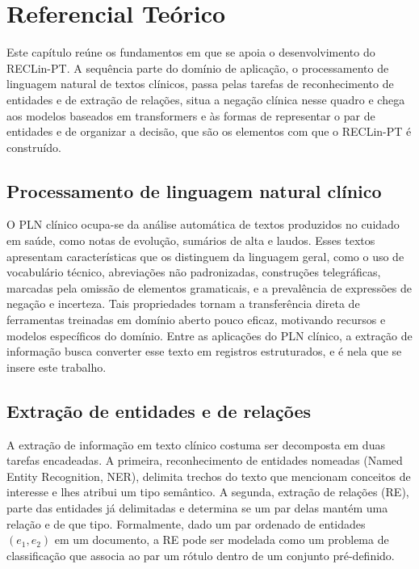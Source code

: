\chapter[Referencial Teórico]{Referencial Teórico}
\label{cap:referencial}

Este capítulo reúne os fundamentos em que se apoia o desenvolvimento do RECLin-PT. A
sequência parte do domínio de aplicação, o processamento de linguagem natural de
textos clínicos, passa pelas tarefas de reconhecimento de entidades e de extração de
relações, situa a negação clínica nesse quadro e chega aos modelos baseados em
\foreignlanguage{english}{transformers} e às formas de representar o par de entidades
e de organizar a decisão, que são os elementos com que o RECLin-PT é construído.

\section{Processamento de linguagem natural clínico}

O PLN clínico ocupa-se da análise automática de textos produzidos no cuidado em
saúde, como notas de evolução, sumários de alta e laudos. Esses textos apresentam características que os distinguem da linguagem geral, como o uso de vocabulário técnico, abreviações não padronizadas, construções telegráficas, marcadas pela omissão de elementos gramaticais, e a prevalência de expressões de negação e incerteza. Tais
propriedades tornam a transferência direta de ferramentas treinadas em domínio
aberto pouco eficaz, motivando recursos e modelos específicos do domínio. Entre as
aplicações do PLN clínico, a extração de informação busca converter esse texto em
registros estruturados, e é nela que se insere este trabalho.

\section{Extração de entidades e de relações}
\label{sec:re_tarefa}

A extração de informação em texto clínico costuma ser decomposta em duas
tarefas encadeadas. A primeira, reconhecimento de entidades nomeadas
(\foreignlanguage{english}{Named Entity Recognition}, NER), delimita trechos do
texto que mencionam conceitos de interesse e lhes atribui um tipo semântico. A
segunda, extração de relações (RE), parte das entidades já delimitadas e determina
se um par delas mantém uma relação e de que tipo. Formalmente, dado um par ordenado
de entidades $(e_1, e_2)$ em um documento, a RE pode ser modelada como um problema
de classificação que associa ao par um rótulo dentro de um conjunto pré-definido.

